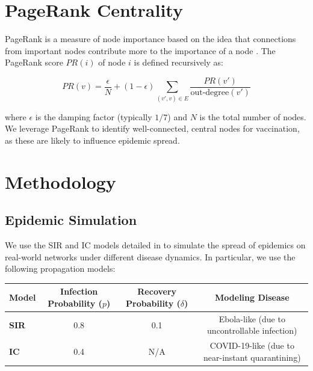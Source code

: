 \documentclass[9pt]{extarticle}
\begin{document}
\section{PageRank Centrality}
\vspace{-0.1cm}

PageRank is a measure of node importance based on the idea that connections from important nodes contribute more to the importance of a node \cite{page1999pagerank}. The PageRank score $PR(i)$ of node $i$ is defined recursively as:

\vspace{-0.3cm}
\begin{equation*}
    PR(v) = \frac{\epsilon}{N} + (1 - \epsilon) \sum_{(v', v) \in E} \frac{PR(v')}{\text{out-degree}(v')}
\end{equation*}
\vspace{-0.3cm}

\noindent
where $\epsilon$ is the damping factor (typically $1/7$) and $N$ is the total number of nodes. We leverage PageRank to identify well-connected, central nodes for vaccination, as these are likely to influence epidemic spread.

\section{Methodology}
\label{sec:methodology}
\vspace{-0.1cm}

\subsection{Epidemic Simulation}
\vspace{-0.1cm}

We use the SIR and IC models detailed in  to simulate the spread of epidemics on real-world networks under different disease dynamics. In particular, we use the following propagation models:

\vspace{-0.2cm}
\begin{table}[H]
    \centering
    \begin{tabular}{|l|c|c|c|}
        \hline
        \textbf{Model} & \textbf{Infection Probability ($p$)} & \textbf{Recovery Probability ($\delta$)} & \textbf{Modeling Disease} \\ \hline
        \textbf{SIR} & 0.8 & 0.1 & Ebola-like (due to uncontrollable infection) \\ \hline
        \textbf{IC} & 0.4 & N/A & COVID-19-like (due to near-instant quarantining) \\ \hline
    \end{tabular}
\end{table}
\end{document}
